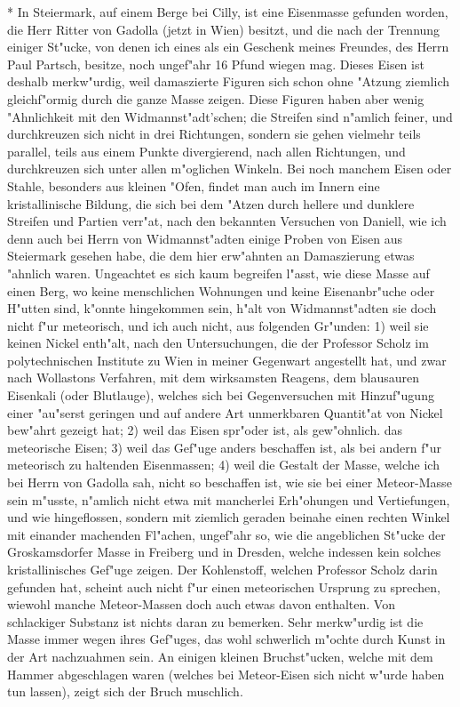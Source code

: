 \documentclass[a4paper, 11pt, oneside, polutonikogreek, german]{article}
\begin{document}
* In Steiermark, auf einem Berge bei Cilly, ist eine Eisenmasse gefunden worden, die Herr Ritter von Gadolla (jetzt in Wien) besitzt, und die nach der Trennung einiger St"ucke, von denen ich eines als ein Geschenk meines Freundes, des Herrn Paul Partsch, besitze, noch ungef"ahr 16 Pfund wiegen mag. Dieses Eisen ist deshalb merkw"urdig, weil damaszierte Figuren sich schon ohne "Atzung ziemlich gleichf"ormig durch die ganze Masse zeigen. Diese Figuren haben aber wenig "Ahnlichkeit mit den Widmannst"adt'schen; die Streifen sind n"amlich feiner, und durchkreuzen sich nicht in drei Richtungen, sondern sie gehen vielmehr teils parallel, teils aus einem Punkte divergierend, nach allen Richtungen, und durchkreuzen sich unter allen m"oglichen Winkeln. Bei noch manchem Eisen oder Stahle, besonders aus kleinen "Ofen, findet man auch im Innern eine kristallinische Bildung, die sich bei dem "Atzen durch hellere und dunklere Streifen und Partien verr"at, nach den bekannten Versuchen von Daniell, wie ich denn auch bei Herrn von Widmannst"adten einige Proben von Eisen aus Steiermark gesehen habe, die dem hier erw"ahnten an Damaszierung etwas "ahnlich waren. Ungeachtet es sich kaum begreifen l"asst, wie diese Masse auf einen Berg, wo keine menschlichen Wohnungen und keine Eisenanbr"uche oder H"utten sind, k"onnte hingekommen sein, h"alt von Widmannst"adten sie doch nicht f"ur meteorisch, und ich auch nicht, aus folgenden Gr"unden: 1) weil sie keinen Nickel enth"alt, nach den Untersuchungen, die der Professor Scholz im polytechnischen Institute zu Wien in meiner Gegenwart angestellt hat, und zwar nach Wollastons Verfahren, mit dem wirksamsten Reagens, dem blausauren Eisenkali (oder Blutlauge), welches sich bei Gegenversuchen mit Hinzuf"ugung einer "au"serst geringen und auf andere Art unmerkbaren Quantit"at von Nickel bew"ahrt gezeigt hat; 2) weil das Eisen spr"oder ist, als gew"ohnlich. das meteorische Eisen; 3) weil das Gef"uge anders beschaffen ist, als bei andern f"ur meteorisch zu haltenden Eisenmassen; 4) weil die Gestalt der Masse, welche ich bei Herrn von Gadolla sah, nicht so beschaffen ist, wie sie bei einer Meteor-Masse sein m"usste, n"amlich nicht etwa mit mancherlei Erh"ohungen und Vertiefungen, und wie hingeflossen, sondern mit ziemlich geraden beinahe einen rechten Winkel mit einander machenden Fl"achen, ungef"ahr so, wie die angeblichen St"ucke der Groskamsdorfer Masse in Freiberg und in Dresden, welche indessen kein solches kristallinisches Gef"uge zeigen. Der Kohlenstoff, welchen Professor Scholz darin gefunden hat, scheint auch nicht f"ur einen meteorischen Ursprung zu sprechen, wiewohl manche Meteor-Massen doch auch etwas davon enthalten. Von schlackiger Substanz ist nichts daran zu bemerken. Sehr merkw"urdig ist die Masse immer wegen ihres Gef"uges, das wohl schwerlich m"ochte durch Kunst in der Art nachzuahmen sein. An einigen kleinen Bruchst"ucken, welche mit dem Hammer abgeschlagen waren (welches bei Meteor-Eisen sich nicht w"urde haben tun lassen), zeigt sich der Bruch muschlich.
\end{document}
